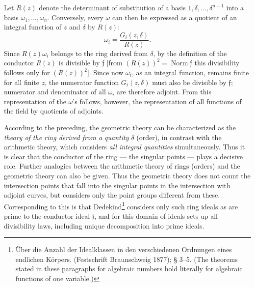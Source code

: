 \documentclass[11pt]{article}
\providecommand{\frf}{\mathfrak f}
\begin{document}
Let \(R(z)\) denote the determinant of substitution of a basis \(1,\delta,\ldots,\delta^{n-1}\) into a basis \(\omega_1,\ldots,\omega_n\). Conversely, every \(\omega\) can then be expressed as a quotient of an integral function of \(z\) and \(\delta\) by \(R(z)\):
\[
\omega_i=\frac{G_i(z,\delta)}{R(z)}.
\]
Since \(R(z)\omega_i\) belongs to the ring derived from \(\delta\), by the definition of the conductor \(R(z)\) is divisible by \(\frf\) [from \((R(z))^2=\operatorname{Norm}\frf\) this divisibility follows only for \((R(z))^2\)]. Since now \(\omega_i\), as an integral function, remains finite for all finite \(z\), the numerator function \(G_i(z,\delta)\) must also be divisible by \(\frf\); numerator and denominator of all \(\omega_i\) are therefore adjoint. From this representation of the \(\omega\)'s follows, however, the representation of all functions of the field by quotients of adjoints.

According to the preceding, the geometric theory can be characterized as the \emph{theory of the ring derived from a quantity \(\delta\)} (order), in contrast with the arithmetic theory, which considers \emph{all integral quantities} simultaneously. Thus it is clear that the conductor of the ring --- the singular points --- plays a decisive role. Further analogies between the arithmetic theory of rings (orders) and the geometric theory can also be given. Thus the geometric theory does not count the intersection points that fall into the singular points in the intersection with adjoint curves, but considers only the point groups different from these. Corresponding to this is that Dedekind\footnote{Über die Anzahl der Idealklassen in den verschiedenen Ordnungen eines endlichen Körpers. (Festschrift Braunschweig 1877); § 3--5. (The theorems stated in these paragraphs for algebraic numbers hold literally for algebraic functions of one variable.)} considers only such ring ideals as are prime to the conductor ideal \(\frf\), and for this domain of ideals sets up all divisibility laws, including unique decomposition into prime ideals.
\end{document}
